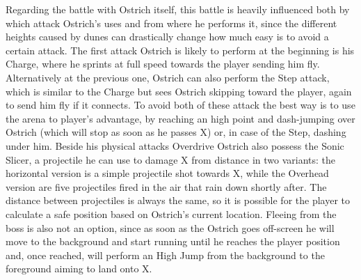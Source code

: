 Regarding the battle with Ostrich itself, this battle is heavily influenced both by which attack Ostrich's uses and from where he performs it, since the different heights caused by dunes can drastically change how much easy is to avoid a certain attack. The first attack Ostrich is likely to perform at the beginning is his Charge, where he sprints at full speed towards the player sending him fly. Alternatively at the previous one, Ostrich can also perform the Step attack, which is similar to the Charge but sees Ostrich skipping toward the player, again to send him fly if it connects. To avoid both of these attack the best way is to use the arena to player's advantage, by reaching an high point and dash-jumping over Ostrich (which will stop as soon as he passes X) or, in case of the Step, dashing under him. Beside his physical attacks Overdrive Ostrich also possess the Sonic Slicer, a projectile he can use to damage X from distance in two variants: the horizontal version is a simple projectile shot towards X, while the Overhead version are five projectiles fired in the air that rain down shortly after. The distance between projectiles is always the same, so it is possible for the player to calculate a safe position based on Ostrich's current location. Fleeing from the boss is also not an option, since as soon as the Ostrich goes off-screen he will move to the  background and start running until he reaches the player position and, once reached, will perform an High Jump from the background to the foreground aiming to land onto X.

